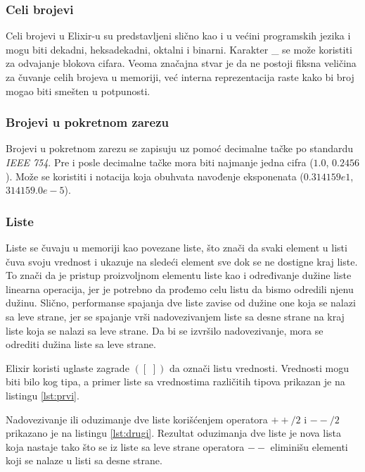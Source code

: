 \documentclass[12pt,oneside]{memoir}
\begin{document}
\subsubsection{Celi brojevi}
Celi brojevi u Elixir-u su predstavljeni slično kao i u većini programskih jezika i mogu biti dekadni, heksadekadni, oktalni i binarni. Karakter \_ se može koristiti za odvajanje blokova cifara. Veoma značajna stvar je da ne postoji fiksna veličina za čuvanje celih brojeva u memoriji, već interna reprezentacija raste kako bi broj mogao biti smešten u potpunosti.

\subsubsection{Brojevi u pokretnom zarezu}
Brojevi u pokretnom zarezu se zapisuju uz pomoć decimalne tačke po standardu \textit{IEEE 754}. Pre i posle decimalne tačke mora biti najmanje jedna cifra ($1.0$, $0.2456$). Može se koristiti i notacija koja obuhvata navođenje eksponenata ($0.314159e1$, $314159.0e-5$). 

\subsubsection{Liste}
Liste se čuvaju u memoriji kao povezane liste, što znači da svaki element u listi čuva svoju vrednost i ukazuje na sledeći element sve dok se ne dostigne kraj liste. To znači da je pristup proizvoljnom elementu liste kao i određivanje dužine liste linearna operacija, jer je potrebno da prođemo celu listu da bismo odredili njenu dužinu. Slično, performanse spajanja dve liste zavise od dužine one koja se nalazi sa leve strane, jer se spajanje vrši nadovezivanjem liste sa desne strane na kraj liste koja se nalazi sa leve strane. Da bi se izvršilo nadovezivanje, mora se odrediti dužina liste sa leve strane.

Elixir koristi uglaste zagrade $([\,\,])$ da označi listu vrednosti. Vrednosti mogu biti bilo kog tipa, a primer liste sa vrednostima različitih tipova prikazan je na listingu \ref{lst:prvi}.



Nadovezivanje ili oduzimanje dve liste korišćenjem operatora $++/2$ i $--/2$ prikazano je na listingu \ref{lst:drugi}. Rezultat oduzimanja dve liste je nova lista koja nastaje tako što se iz liste sa leve strane operatora $--$ eliminišu elementi koji se nalaze u listi sa desne strane.
\end{document}
